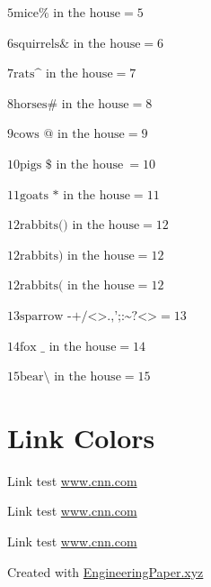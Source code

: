 \documentclass[
  letterpaper,
]{article}
\begin{document}
\(5\text{mice\%{} in the house}= 5\)

\(6\text{squirrels\&{} in the house}= 6\)

\(7\text{rats\textasciicircum{} in the house}= 7\)

\(8\text{horses\#{} in the house}= 8\)

\(9\text{cows @ in the house}= 9\)

\(10\text{pigs \${} in the house}\:= 10\)

\(11\text{goats * in the house}= 11\)

\(12\text{rabbits() in the house}= 12\)

\(12\text{rabbits) in the house}= 12\)

\(12\text{rabbits( in the house}= 12\)

\(13\text{sparrow -+/<>.,';:\textasciitilde{}?<>}= 13\)

\(14\text{fox \_{} in the house}= 14\)

\(15\text{bear\textbackslash{} in the house}= 15\)

\section{Link Colors}\label{link-colors}

Link test \href{https://www.cnn.com}{www.cnn.com}

Link test
\href{https://www.cnn.com}{{\textcolor[HTML]{F06666}{\colorbox[HTML]{FFFF66}{www.cnn.com}}}}

{\textcolor[HTML]{66B966}{\colorbox[HTML]{FFFFCC}{Link test
\href{https://www.cnn.com}{www.cnn.com}}}}

Created with \href{https://engineeringpaper.xyz}{EngineeringPaper.xyz}
\end{document}
